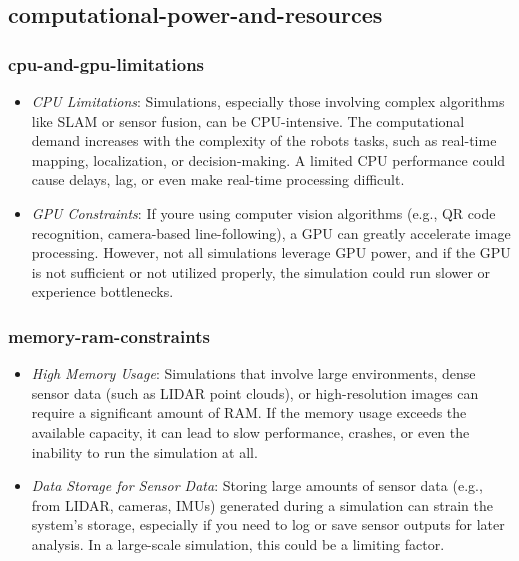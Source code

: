 \documentclass[../../main]{subfiles}
\begin{document}
    
    \subsection{computational-power-and-resources}    

    \subsubsection{cpu-and-gpu-limitations}

    \begin{itemize}
    \item
      \emph{CPU Limitations}: Simulations, especially those involving
      complex algorithms like SLAM or sensor fusion, can be CPU-intensive.
      The computational demand increases with the complexity of the
      robot\textquotesingle s tasks, such as real-time mapping,
      localization, or decision-making. A limited CPU performance could
      cause delays, lag, or even make real-time processing difficult.
    \item
      \emph{GPU Constraints}: If you\textquotesingle re using computer
      vision algorithms (e.g., QR code recognition, camera-based
      line-following), a GPU can greatly accelerate image processing.
      However, not all simulations leverage GPU power, and if the GPU is not
      sufficient or not utilized properly, the simulation could run slower
      or experience bottlenecks.
    \end{itemize}
    
    \subsubsection{memory-ram-constraints}   
    \begin{itemize}
    \item
      \emph{High Memory Usage}: Simulations that involve large
      environments, dense sensor data (such as LIDAR point clouds), or
      high-resolution images can require a significant amount of RAM. If the
      memory usage exceeds the available capacity, it can lead to slow
      performance, crashes, or even the inability to run the simulation at
      all.
    \item
      \emph{Data Storage for Sensor Data}: Storing large amounts of sensor
      data (e.g., from LIDAR, cameras, IMUs) generated during a simulation
      can strain the system's storage, especially if you need to log or save
      sensor outputs for later analysis. In a large-scale simulation, this
      could be a limiting factor.
    \end{itemize}
    
\end{document}

